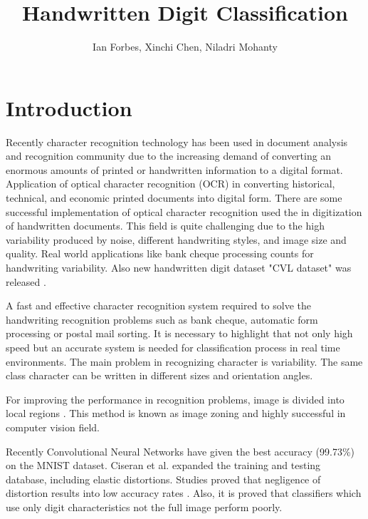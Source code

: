 \documentclass[10pt,twocolumn]{article}
\title{Handwritten Digit Classification}
\author{Ian Forbes, Xinchi Chen, Niladri Mohanty}
\begin{document}
\section{Introduction}
Recently character recognition technology has been used in document analysis and recognition community due to the increasing demand of converting an enormous amounts of printed or handwritten information to a digital format. Application of optical character recognition (OCR) in converting historical, technical, and economic printed documents into digital form. There are some successful implementation of optical character recognition used the in digitization of handwritten documents. This field is quite challenging due to the high variability produced by noise, different handwriting styles, and image size and quality. Real world applications like bank cheque processing counts for handwriting variability\cite {diem2013icdar}. Also new handwritten digit dataset "CVL dataset" was released \cite {liu2003handwritten}. 

A fast and effective character recognition system required to solve the handwriting recognition problems such as bank cheque, automatic form processing or postal mail sorting. It is necessary to highlight that not only high speed but an accurate system is needed for classification process in real time environments. The main problem in recognizing character is variability. The same class character can be written in different sizes and orientation angles.

For improving the performance in recognition problems, image is divided into local regions \cite {lazebnik2006beyond}. This method is known as image zoning and highly successful in computer vision field\cite {ciresan2012multi}.

Recently Convolutional Neural Networks have given the best accuracy (99.73\%) on the MNIST dataset. Ciseran et al. expanded the training and testing database, including elastic distortions. Studies proved that negligence of distortion results into low accuracy rates \cite {gil2014handwritten}. Also, it is proved that classifiers which use only digit characteristics not the full image perform poorly.
\end{document}

